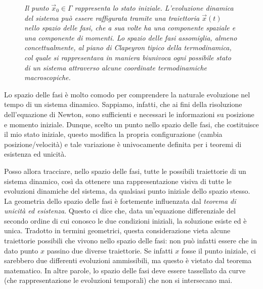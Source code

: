 \documentclass[a4paper,openany]{article}
\begin{document}
	\begin{figure}[H]
		\centering
		\caption{\textit{Il punto $\vec{x}_{0} \in \Gamma$ rappresenta lo stato iniziale. L'evoluzione dinamica del sistema può essere raffigurata tramite una traiettoria $\vec{x}(t)$ nello spazio delle fasi, che a sua volte ha una componente spaziale e una componente di momenti. Lo spazio delle fasi assomiglia, almeno concettualmente, al piano di Clapeyron tipico della termodinamica, col quale si rappresentava in maniera biunivoca ogni possibile stato di un sistema attraverso alcune coordinate termodinamiche macroscopiche.}}
	\end{figure}
	
	Lo spazio delle fasi è molto comodo per comprendere la naturale evoluzione nel tempo di un sistema dinamico. Sappiamo, infatti, che ai fini della risoluzione dell'equazione di Newton, sono sufficienti e necessari le informazioni su posizione e momento iniziale. Dunque, scelto un punto nello spazio delle fasi, che costituisce il mio stato iniziale, questo modifica la propria configurazione (cambia posizione/velocità) e tale variazione è univocamente definita per i teoremi di esistenza ed unicità.
	
	Posso allora tracciare, nello spazio delle fasi, tutte le possibili traiettorie di un sistema dinamico, così da ottenere una rappresentazione visiva di tutte le evoluzioni dinamiche del sistema, da qualsiasi punto iniziale dello spazio stesso.
	La geometria dello spazio delle fasi è fortemente influenzata dal \textit{teorema di unicità ed esistenza}. Questo ci dice che, data un'equazione differenziale del secondo ordine di cui conosco le due condizioni iniziali, la soluzione esiste ed è unica. Tradotto in termini geometrici, questa considerazione vieta alcune traiettorie possibili che vivono nello spazio delle fasi: non può infatti essere che in dato punto $x$ passino due diverse traiettorie. Se infatti $x$ fosse il punto iniziale, ci sarebbero due differenti evoluzioni ammissibili, ma questo è vietato dal teorema matematico. In altre parole, lo spazio delle fasi deve essere tassellato da curve (che rappresentazione le evoluzioni temporali) che non si intersecano mai.
\end{document}

